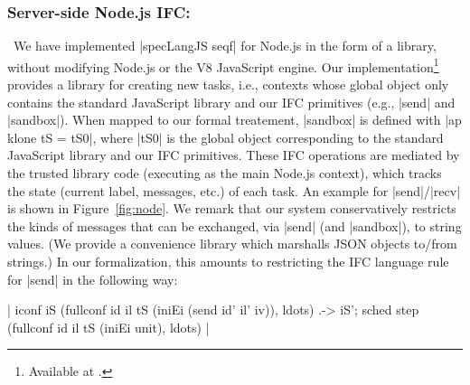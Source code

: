 \subsubsection{Server-side Node.js IFC:}\ 
We have implemented |specLangJS seqf| for Node.js in the form of a
library, without modifying Node.js or the V8 JavaScript engine.
%
Our implementation\footnote{Available at \codelink{}.} provides a
library for creating new tasks, i.e., contexts whose global object
only contains the standard JavaScript library and our IFC primitives
(e.g., |send| and |sandbox|).
%
When mapped to our formal treatement, |sandbox| is defined with |ap
klone tS = tS0|, where |tS0| is the global object corresponding to the
standard JavaScript library and our IFC primitives.
%
%
These IFC operations are mediated by the trusted library code (executing
as the main Node.js context), which tracks the state (current label, messages,
etc.) of each task.  An example for |send|/|recv| is shown in
Figure~\ref{fig:node}.
We remark that our system conservatively restricts
the kinds of messages that can be exchanged, via |send| (and |sandbox|),
to string values.
%
(We provide a convenience library which marshalls JSON objects to/from strings.)
%
In our formalization, this amounts to restricting the IFC language rule
for |send| in the following way:
\newcommand{\str}{"string"}
\begin{mathpar}
{|
iconf iS (fullconf id il tS (iniEi (send id' il' iv)), ldots)
.->
iS'; sched step (fullconf id il tS (iniEi unit), ldots)
|}
\end{mathpar}
%

